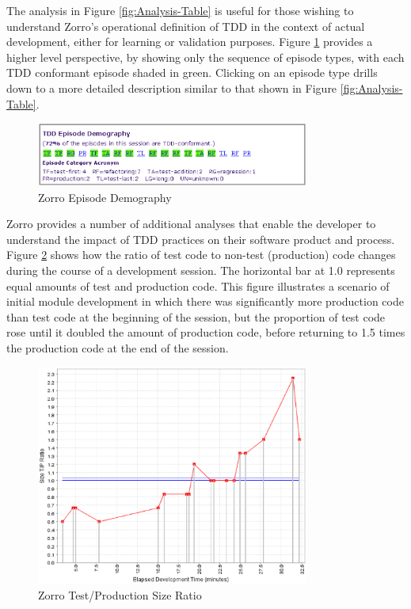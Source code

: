 \documentclass[smallextended]{svjour3}     %
\begin{document}
The analysis in Figure \ref{fig:Analysis-Table} is useful for those wishing
to understand Zorro's operational definition of TDD in the context of
actual development, either for learning or validation purposes.  Figure
\ref{fig:Analysis-Demography} provides a higher level perspective, by
showing only the sequence of episode types, with each TDD conformant
episode shaded in green. Clicking on an episode type drills down to a more
detailed description similar to that shown in Figure
\ref{fig:Analysis-Table}.

\begin{figure}[th]
  \center
  \includegraphics[width=0.80\textwidth]{zorro-episode-demography.eps}
  \caption{Zorro Episode Demography}
  \label{fig:Analysis-Demography}
\end{figure} 

Zorro provides a number of additional analyses that enable the developer to
understand the impact of TDD practices on their software product and
process.  Figure \ref{fig:Analysis-Ratio} shows how the ratio of test code
to non-test (production) code changes during the course of a development
session.  The horizontal bar at 1.0 represents equal amounts of test and
production code.  This figure illustrates a scenario of initial module
development in which there was significantly more production code than test
code at the beginning of the session, but the proportion of test code rose
until it doubled the amount of production code, before returning to 1.5
times the production code at the end of the session.

\begin{figure}[th]
  \center
  \includegraphics[width=0.80\textwidth]{zorro-test-production-size-ratio.eps}
  \caption{Zorro Test/Production Size Ratio}
  \label{fig:Analysis-Ratio}
\end{figure} 
\end{document}
